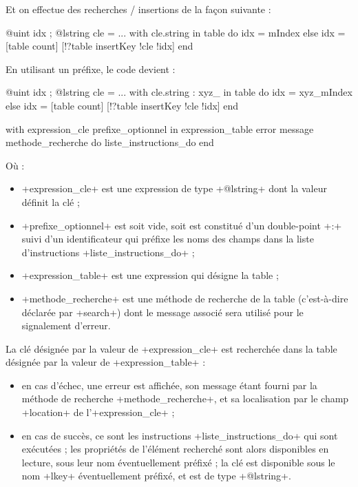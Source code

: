 Et on effectue des recherches / insertions de la façon suivante :
\begin{galgas}
@uint idx ;
@lstring cle = ...
with cle.string in table do
  idx = mIndex
else
  idx = [table count]
  [!?table insertKey !cle !idx]
end
\end{galgas}

En utilisant un préfixe, le code devient :
\begin{galgas}
@uint idx ;
@lstring cle = ...
with cle.string : xyz_ in table do
  idx = xyz_mIndex
else
  idx = [table count]
  [!?table insertKey !cle !idx]
end
\end{galgas}






\begin{galgas}
with expression_cle prefixe_optionnel in expression_table
error message methode_recherche
do
  liste_instructions_do
end
\end{galgas}

Où :
\begin{itemize}
  \item \ggs+expression_cle+ est une expression de type \ggs+@lstring+ dont la valeur définit la clé ;
  \item \ggs+prefixe_optionnel+ est soit vide, soit est constitué d'un double-point \ggs+:+ suivi d'un identificateur qui préfixe les noms des champs dans la liste d'instructions \ggs+liste_instructions_do+ ;
  \item \ggs+expression_table+ est une expression qui désigne la table ;
  \item \ggs+methode_recherche+ est une méthode de recherche de la table (c'est-à-dire déclarée par \ggs+search+) dont le message associé sera utilisé pour le signalement d'erreur.
\end{itemize}

La clé désignée par la valeur de \ggs+expression_cle+ est recherchée dans la table désignée par la valeur de \ggs+expression_table+ :
\begin{itemize}
  \item en cas d'échec, une erreur est affichée, son message étant fourni par la méthode de recherche \ggs+methode_recherche+, et sa localisation par le champ \ggs+location+ de l'\ggs+expression_cle+ ;
  \item en cas de succès, ce sont les instructions \ggs+liste_instructions_do+ qui sont exécutées ; les propriétés de l'élément recherché sont alors disponibles en lecture, sous leur nom éventuellement préfixé ; la clé est disponible sous le nom \ggs+lkey+ éventuellement préfixé, et est de type \ggs+@lstring+.
\end{itemize}

